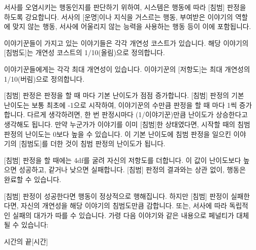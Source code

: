 \documentclass{report}
\begin{document}
	
	서사를 오염시키는 행동인지를 판단하기 위하여, 시스템은 행동에 따라 [침범] 판정을 하도록 강요합니다. 서사의 [운명]이나 지식을 거스르는 행동, 부여받은 이야기의 역할에 맞지 않는 행동, 서사에 어울리지 않는 능력을 사용하는 행동 등이 이에 포함됩니다.
	
	이야기꾼들이 가지고 있는 이야기들은 각각 개연성 코스트가 있습니다. 해당 이야기의 [침범도]는 개연성 코스트의 1/10(올림)으로 정의합니다.
	
	이야기꾼들에게는 각각 최대 개연성이 있습니다. 이야기꾼의 [저항도]는 최대 개연성의 1/10(버림)으로 정의합니다.
	
	\bigskip
	
	[침범] 판정은 판정을 할 때 마다 기본 난이도가 점점 증가합니다. [침범] 판정의 기본 난이도는 보통 최초에 -1으로 시작하여, 이야기꾼의 수만큼 판정을 할 때 마다 1씩 증가합니다. 다르게 생각하려면, 한 번 판정시마다 (1/이야기꾼)만큼 난이도가 상승한다고 생각해도 됩니다. 만약 누군가가 이야기를 이미 [침범]한 상태였다면, 시작할 때의 침범 판정의 난이도는 0보다 높을 수 있습니다. 이 기본 난이도에 침범 판정을 일으킨 이야기의 [침범도]를 더한 것이 침범 판정의 난이도가 됩니다.
	
	[침범] 판정을 할 때에는 4df를 굴려 자신의 저항도를 더합니다. 이 값이 난이도보다 높으면 성공하고, 같거나 낮으면 실패합니다. [침범] 판정의 결과와는 상관 없이, 행동은 완료할 수 있습니다.
	
	[침범] 판정이 성공한다면 행동이 정상적으로 행해집니다. 하지만 [침범] 판정이 실패한다면, 자신의 개연성을 해당 이야기의 침범도만큼 감합니다. 또는, 서사에 따라 독립적인 실패의 대가가 따를 수 있습니다. 가령 다음 이야기와 같은 내용으로 페널티가 대체될 수 있습니다:
	
	\begin{story}{시간의 끝}{[시간]}
	\end{story}
	
\end{document}
